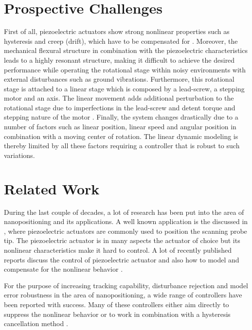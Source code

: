 \newpage
\section{Prospective Challenges}\label{sec:prospectiveChallanges}
First of all, piezoelectric actuators show strong nonlinear properties such as hysteresis and creep (drift), which have to be compensated for \citep{Piezo:2008}. Moreover, the mechanical flexural structure in combination with the piezoelectric characteristics leads to a highly resonant structure, making it difficult to achieve the desired performance while operating the rotational stage within noisy environments with external disturbances such as ground vibrations. Furthermore, this rotational stage is attached to a linear stage which is composed by a lead-screw, a stepping motor and an axis. The linear movement adds additional perturbation to the rotational stage due to imperfections in the lead-screw and detent torque and stepping nature of the motor \citep{ButcherController:2015}. Finally, the system changes drastically due to a number of factors such as linear position, linear speed and angular position in combination with a moving center of rotation. The linear dynamic modeling is thereby limited by all these factors requiring a controller that is robust to such variations.

\section{Related Work}
During the last couple of decades, a lot of research has been put into the area of nanopositioning and its applications. A well known application is the \abbrAFM discussed in \citep{chuang2013robust, SurveyOfControlIssues:2007}, where piezoelectric actuators are commonly used to position the scanning probe tip. The piezoelectric actuator is in many aspects the actuator of choice but its nonlinear characteristics make it hard to control. A lot of recently published reports discuss the control of piezoelectric actuator \citep{gu2013motion, gu2016modeling} and also how to model and compensate for the nonlinear behavior \citep{Biggio:2014,ButcherIdentification:2015,Maxwell:2012,leang2002hysteresis}.

For the purpose of increasing tracking capability, disturbance rejection and model error robustness in the area of nanopositioning, a wide range of controllers have been reported with success. Many of these controllers either aim directly to suppress the nonlinear behavior \citep{Elmali:1996,ompc, xu2014model} or to work in combination with a hysteresis cancellation method \citep{gu:2014, inputshaper}.

